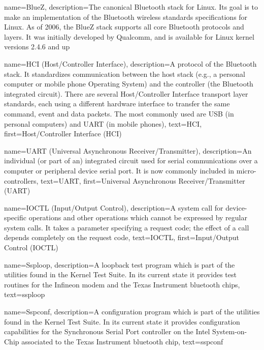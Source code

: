 {
  name=BlueZ,
  description={The canonical Bluetooth stack for Linux. Its goal is to
    make an implementation of the Bluetooth wireless standards
    specifications for Linux. As of 2006, the BlueZ stack supports all
    core Bluetooth protocols and layers. It was initially developed by
    Qualcomm, and is available for Linux kernel versions 2.4.6 and up}
}

{
  name=HCI (Host/Controller Interface),
  description={A protocol of the Bluetooth stack. It standardizes
    communication between the host stack (e.g., a personal computer or
    mobile phone Operating System) and the controller (the Bluetooth
    integrated circuit). There are several Host/Controller Interface
    transport layer standards, each using a different hardware
    interface to transfer the same command, event and data
    packets. The most commonly used are USB (in personal computers)
    and UART (in mobile phones)},
  text=HCI,
  first=Host/Controller Interface (HCI)
}

{
  name=UART (Universal Asynchronous Receiver/Transmitter),
  description={An individual (or part of an) integrated circuit used
    for serial communications over a computer or peripheral device
    serial port. It is now commonly included in micro-controllers},
  text=UART,
  first=Universal Asynchronous Receiver/Transmitter (UART)
}

{
  name=IOCTL (Input/Output Control),
  description={A system call for device-specific operations and other
    operations which cannot be expressed by regular system calls. It
    takes a parameter specifying a request code; the effect of a call
    depends completely on the request code},
  text=IOCTL,
  first=Input/Output Control (IOCTL)
}

{
  name=Ssploop,
  description={A loopback test program which is part of the utilities
    found in the Kernel Test Suite. In its current state it provides
    test routines for the Infineon modem and the Texas Instrument
    bluetooth chips},
  text=ssploop
}

{
  name=Sspconf,
  description={A configuration program which is part of the utilities
    found in the Kernel Test Suite. In its current state it provides
    configuration capabilities for the Synchronous Serial Port
    controller on the Intel System-on-Chip associated to the Texas
    Instrument bluetooth chip},
  text=sspconf
}

